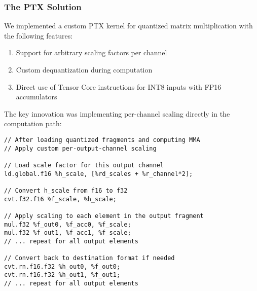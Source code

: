 \subsubsection{The PTX Solution}

We implemented a custom PTX kernel for quantized matrix multiplication with the following features:
\begin{enumerate}
    \item Support for arbitrary scaling factors per channel
    \item Custom dequantization during computation
    \item Direct use of Tensor Core instructions for INT8 inputs with FP16 accumulators
\end{enumerate}

The key innovation was implementing per-channel scaling directly in the computation path:

\begin{lstlisting}[style=ptx]
// After loading quantized fragments and computing MMA
// Apply custom per-output-channel scaling

// Load scale factor for this output channel
ld.global.f16 %h_scale, [%rd_scales + %r_channel*2];

// Convert h_scale from f16 to f32
cvt.f32.f16 %f_scale, %h_scale;

// Apply scaling to each element in the output fragment
mul.f32 %f_out0, %f_acc0, %f_scale;
mul.f32 %f_out1, %f_acc1, %f_scale;
// ... repeat for all output elements

// Convert back to destination format if needed
cvt.rn.f16.f32 %h_out0, %f_out0;
cvt.rn.f16.f32 %h_out1, %f_out1;
// ... repeat for all output elements
\end{lstlisting}

